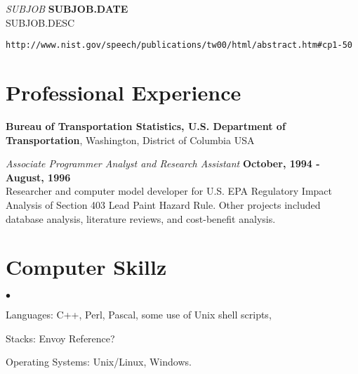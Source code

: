 \documentclass[margin,line]{res}
\newenvironment{list2}{
  \begin{list}{$\bullet$}{
      \setlength{\itemsep}{0in}
      \setlength{\parsep}{0in} \setlength{\parskip}{0in}
      \setlength{\topsep}{0in} \setlength{\partopsep}{0in} 
      \setlength{\leftmargin}{0.2in}}}{\end{list}}
\begin{document}
\begin{resume}
{\em SUBJOB} \hfill {\bf SUBJOB.DATE}\\
SUBJOB.DESC


\begin{verbatim}http://www.nist.gov/speech/publications/tw00/html/abstract.htm#cp1-50\end{verbatim}

\section{\sc Professional Experience}
{\bf Bureau of Transportation Statistics, U.S. Department of
  Transportation}, Washington, District of Columbia USA

\vspace{-.3cm}

\vspace{-.3cm}
{\em Associate Programmer Analyst and Research Assistant} \hfill {\bf
  October, 1994 - August, 1996}\\
Researcher and computer model developer for U.S. EPA Regulatory Impact
Analysis of Section 403 Lead Paint Hazard Rule.  Other projects
included database analysis, literature reviews, and cost-benefit analysis.

\section{\sc Computer Skillz} 
\begin{list2}
\item Languages:  C++, Perl, Pascal, some use of Unix shell scripts,
\item Stacks: Envoy Reference?
\item  
\item Operating Systems:  Unix/Linux, Windows.\\ 
\end{list2}


\end{resume}
\end{document}
